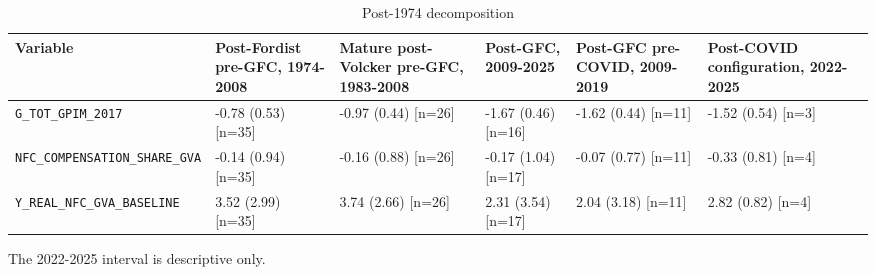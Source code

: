 \begin{landscape}
\begin{table}[p]
\centering
\small
\caption{Post-1974 decomposition}
\begin{tabular}{p{4.2cm}p{2.7cm}p{2.7cm}p{2.7cm}p{2.7cm}p{2.7cm}}
\toprule
Variable & Post-Fordist pre-GFC, 1974-2008 & Mature post-Volcker pre-GFC, 1983-2008 & Post-GFC, 2009-2025 & Post-GFC pre-COVID, 2009-2019 & Post-COVID configuration, 2022-2025
\\
\midrule
\nolinkurl{G_TOT_GPIM_2017} & -0.78 (0.53) [n=35] & -0.97 (0.44) [n=26] & -1.67 (0.46) [n=16] & -1.62 (0.44) [n=11] & -1.52 (0.54) [n=3]
\\
\nolinkurl{NFC_COMPENSATION_SHARE_GVA} & -0.14 (0.94) [n=35] & -0.16 (0.88) [n=26] & -0.17 (1.04) [n=17] & -0.07 (0.77) [n=11] & -0.33 (0.81) [n=4]
\\
\nolinkurl{Y_REAL_NFC_GVA_BASELINE} & 3.52 (2.99) [n=35] & 3.74 (2.66) [n=26] & 2.31 (3.54) [n=17] & 2.04 (3.18) [n=11] & 2.82 (0.82) [n=4]
\\
\bottomrule
\end{tabular}
\par\vspace{0.3em}\footnotesize The 2022-2025 interval is descriptive only.
\end{table}
\end{landscape}
